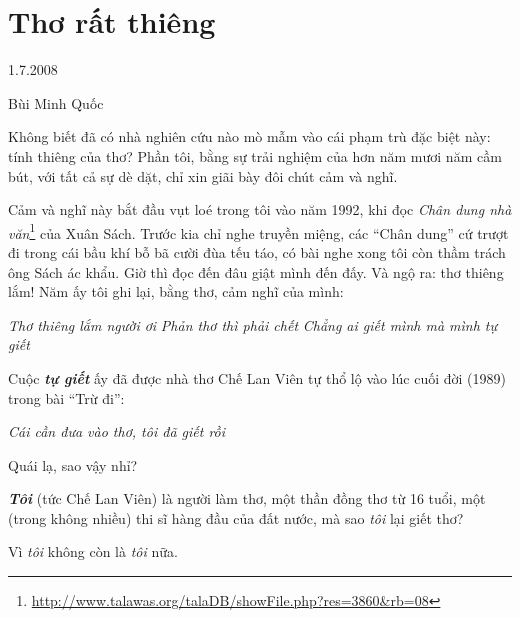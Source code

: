 \documentclass[../main.tex]{subfiles}
\begin{document}
\chapter{Thơ rất thiêng}

\begin{metadata}

\begin{flushright}1.7.2008\end{flushright}

Bùi Minh Quốc



\end{metadata}

\begin{multicols}{2}

Không biết đã có nhà nghiên cứu nào mò mẫm vào cái phạm trù đặc biệt này: tính thiêng của thơ? Phần tôi, bằng sự trải nghiệm của hơn năm mươi năm cầm bút, với tất cả sự dè dặt, chỉ xin giãi bày đôi chút cảm và nghĩ. 
 
Cảm và nghĩ này bắt đầu vụt loé trong tôi vào năm 1992, khi đọc \textit{Chân dung nhà văn}\footnote{\url{http://www.talawas.org/talaDB/showFile.php?res=3860&rb=08}}\textit{ }của Xuân Sách. Trước kia chỉ nghe truyền miệng, các “Chân dung” cứ trượt đi trong cái bầu khí bỗ bã cười đùa tếu táo, có bài nghe xong tôi còn thầm trách ông Sách ác khẩu. Giờ thì đọc đến đâu giật mình đến đấy. Và ngộ ra: thơ thiêng lắm! Năm ấy tôi ghi lại, bằng thơ, cảm nghĩ của mình: 
\begin{blockquote}
        
\textit{Thơ thiêng lắm người ơi}        
\textit{Phản thơ thì phải chết} 
\textit{Chẳng ai giết mình mà mình tự giết} 

\end{blockquote}
 
Cuộc \textit{\textbf{tự giết}} ấy đã được nhà thơ Chế Lan Viên tự thổ lộ vào lúc cuối đời (1989) trong bài “Trừ đi”: 
\begin{blockquote}
 
\textit{Cái cần đưa vào thơ, tôi đã giết rồi } 

\end{blockquote}
 
Quái lạ, sao vậy nhỉ? 
 
\textit{\textbf{Tôi}} (tức Chế Lan Viên) là người làm thơ, một thần đồng thơ từ 16 tuổi, một (trong không nhiều) thi sĩ hàng đầu của đất nước, mà sao \textit{tôi }lại giết thơ?  
 
Vì \textit{tôi} không còn là \textit{tôi} nữa. 
 

\end{multicols}
\end{document}
